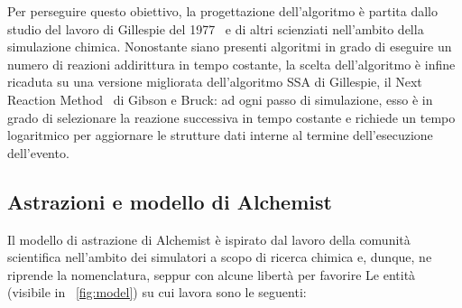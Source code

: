             Per perseguire questo obiettivo, la progettazione dell'algoritmo è partita dallo studio del lavoro di Gillespie del 1977~\cite{gillespie1977} e di altri scienziati nell'ambito della simulazione chimica. Nonostante siano presenti algoritmi in grado di eseguire un numero di reazioni addirittura in tempo costante, la scelta dell'algoritmo è infine ricaduta su una versione migliorata dell'algoritmo SSA di Gillespie, il Next Reaction Method~\cite{nextReactionMethod} di Gibson e Bruck: ad ogni passo di simulazione, esso è in grado di selezionare la reazione successiva in tempo costante e richiede un tempo logaritmico per aggiornare le strutture dati interne al termine dell'esecuzione dell'evento.


        \subsection{Astrazioni e modello di Alchemist}\label{sub:modello}
            Il modello di astrazione di Alchemist è ispirato dal lavoro della comunità scientifica nell'ambito dei simulatori a scopo di ricerca chimica e, dunque, ne riprende la nomenclatura, seppur con alcune libertà per favorire
            Le entità (visibile in \figurename~\vref{fig:model}) su cui lavora sono le seguenti:

